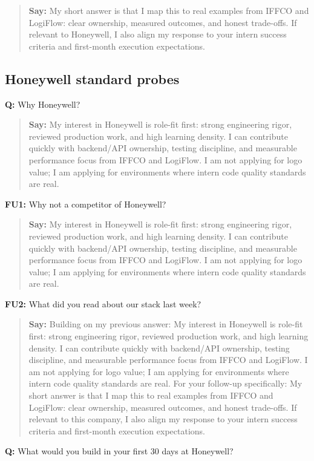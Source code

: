 \documentclass[9pt,a4paper]{article}
\begin{document}
\begin{quote}\small\textbf{Say:} My short answer is that I map this to real examples from IFFCO and LogiFlow: clear ownership, measured outcomes, and honest trade-offs. If relevant to Honeywell, I also align my response to your intern success criteria and first-month execution expectations.\end{quote}
\vspace{2mm}
\subsection{Honeywell standard probes}
\textbf{Q:} Why Honeywell?

\begin{quote}\small\textbf{Say:} My interest in Honeywell is role-fit first: strong engineering rigor, reviewed production work, and high learning density. I can contribute quickly with backend/API ownership, testing discipline, and measurable performance focus from IFFCO and LogiFlow. I am not applying for logo value; I am applying for environments where intern code quality standards are real.\end{quote}
\vspace{2mm}
\textbf{FU1:} Why not a competitor of Honeywell?

\begin{quote}\small\textbf{Say:} My interest in Honeywell is role-fit first: strong engineering rigor, reviewed production work, and high learning density. I can contribute quickly with backend/API ownership, testing discipline, and measurable performance focus from IFFCO and LogiFlow. I am not applying for logo value; I am applying for environments where intern code quality standards are real.\end{quote}
\vspace{2mm}
\textbf{FU2:} What did you read about our stack last week?

\begin{quote}\small\textbf{Say:} Building on my previous answer: My interest in Honeywell is role-fit first: strong engineering rigor, reviewed production work, and high learning density. I can contribute quickly with backend/API ownership, testing discipline, and measurable performance focus from IFFCO and LogiFlow. I am not applying for logo value; I am applying for environments where intern code quality standards are real. For your follow-up specifically: My short answer is that I map this to real examples from IFFCO and LogiFlow: clear ownership, measured outcomes, and honest trade-offs. If relevant to this company, I also align my response to your intern success criteria and first-month execution expectations.\end{quote}
\vspace{2mm}
\textbf{Q:} What would you build in your first 30 days at Honeywell?
\end{document}
